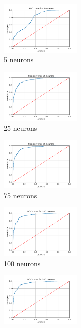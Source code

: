 \documentclass[a4paper]{article}    %
\begin{document}
\begin{figure}[H]
    \centering
    \begin{subfigure}{0.32\textwidth}
        \centering
        \includegraphics[width=3.85cm]{ROC_5}
        \caption{5 neurons}
        \label{fig:mlp-5_roc}
    \end{subfigure}
    \hfill
    \begin{subfigure}{0.32\textwidth}
        \centering
        \includegraphics[width=3.85cm]{ROC_25}
        \caption{25 neurons}
        \label{fig:mlp-25_roc}
    \end{subfigure}
    \hfill
    \begin{subfigure}{0.32\textwidth}
        \centering
        \includegraphics[width=3.85cm]{ROC_75}
        \caption{75 neurons}
        \label{fig:mlp-75_roc}
    \end{subfigure}
    \hfill
    \begin{subfigure}{0.32\textwidth}
        \centering
        \includegraphics[width=3.85cm]{ROC_100}
        \caption{100 neurons}
        \label{fig:mlp-100_roc}
    \end{subfigure}
    \hfill
    \begin{subfigure}{0.32\textwidth}
        \centering
        \includegraphics[width=3.85cm]{ROC_300}

\end{subfigure}
\end{figure}
\end{document}
